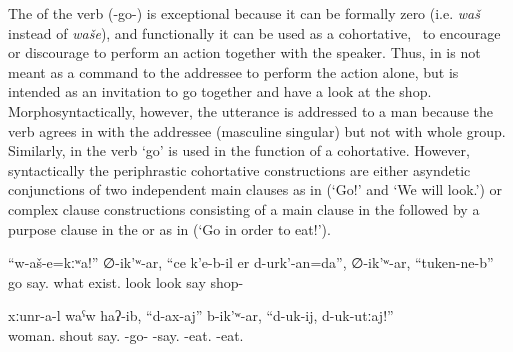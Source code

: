 The  of the verb  (-go-) is exceptional because it can be formally zero (i.e. \textit{waš} instead of \textit{waše}), and functionally it can be used as a cohortative, \tie\ to encourage or discourage to perform an action together with the speaker. Thus, in   is not meant as a command to the addressee to perform the action alone, but is intended as an invitation to go together and have a look at the shop. Morphosyntactically, however, the utterance is addressed to a man because the verb agrees in  with the addressee (masculine singular) but not with whole group. Similarly, in  the verb `go' is used in the function of a cohortative. However, syntactically the periphrastic cohortative constructions are either asyndetic conjunctions of two independent main clauses as in  (`Go!' and `We will look.') or complex clause constructions consisting of a main clause in the  followed by a purpose clause in the  or  as in  (`Go in order to eat!').

\begin{exe}
	\ex	\label{ex:‎Let's go (together) and look what is there in the shop}
	\gll	``w-aš-e=kːʷa!''	∅-ik'ʷ-ar,	``ce	k'e-b-il	er	d-urk'-an=da'',	∅-ik'ʷ-ar, ``tuken-ne-b''\\
		go		say.	what	exist.	look	look	say	shop-\\
	\glt	{}
	
			\ex	\label{ex:The women shouted ``Let's go eating!''}
		\gll	xːunr-a-l waˁw	haʔ-ib,	``d-ax-aj''	b-ik'ʷ-ar, ``d-uk-ij,	d-uk-utːaj!''\\
			woman. shout	say.	-go-	-say.	\tsc{1/2pl}-eat.	-eat.\\
		\glt	{} 
\end{exe}





